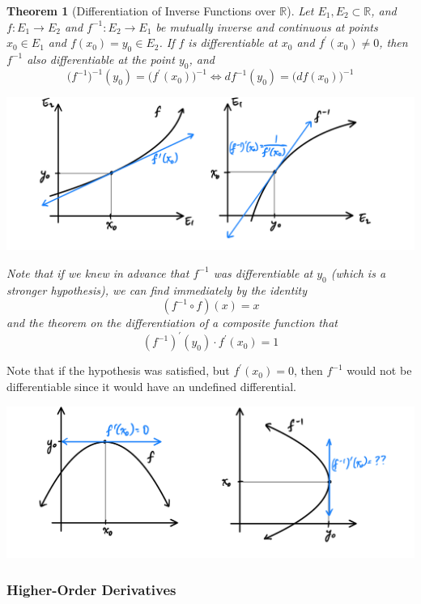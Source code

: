 \documentclass{article}
\newtheorem{theorem}{Theorem}[section]
\theoremstyle{remark}
\theoremstyle{definition}
\begin{document}
\begin{theorem}[Differentiation of Inverse Functions over $\mathbb{R}$]
Let $E_1, E_2 \subset \mathbb{R}$, and $f: E_1 \longrightarrow E_2$ and $f^{-1}: E_2 \longrightarrow E_1$ be mutually inverse and continuous at points $x_0 \in E_1$ and $f(x_0) = y_0 \in E_2$. If $f$ is differentiable at $x_0$ and $f^\prime(x_0) \neq 0$, then $f^{-1}$ also differentiable at the point $y_0$, and 
\[\big(f^{-1}\big)^{-1} (y_0) = \big(f^\prime (x_0)\big)^{-1} \iff df^{-1} (y_0) = \big(df(x_0)\big)^{-1}\]
\begin{center}
    \includegraphics[scale=0.3]{img/Real_Analysis_Differentiation_Inverse_Functions.PNG}
\end{center}
Note that if we knew in advance that $f^{-1}$ was differentiable at $y_0$ (which is a stronger hypothesis), we can find immediately by the identity 
\[(f^{-1} \circ f) (x) = x\]  
and the theorem on the differentiation of a composite function that
\[(f^{-1})^\prime (y_0) \cdot f^\prime (x_0) = 1\]
\end{theorem}

Note that if the hypothesis was satisfied, but $f^\prime (x_0) = 0$, then $f^{-1}$ would not be differentiable since it would have an undefined differential. 
\begin{center}
    \includegraphics[scale=0.3]{img/Inverse_Function_Differentiation_Derivative_Zero_problem.PNG}
\end{center}
\subsubsection{Higher-Order Derivatives}
\end{document}

